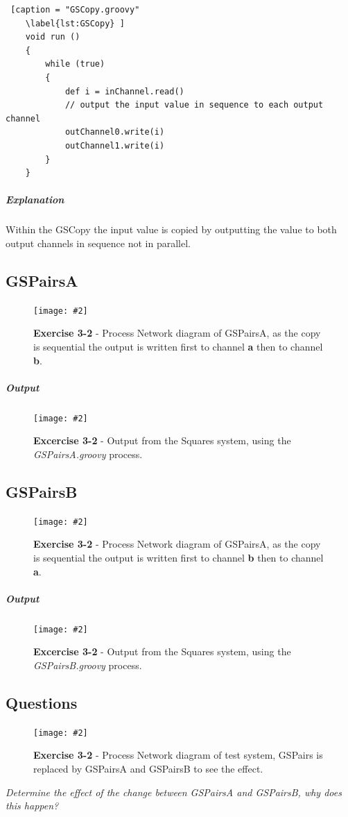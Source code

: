 \documentclass[10pt, a4paper]{article}
\newcommand{\figuremacro}[5]{
    \begin{figure}[#1]
        \centering
        \texttt{[image: \#2]}
        \caption[#3]{\textbf{#3}#4}
        \label{fig:#2}
    \end{figure}
}
\begin{document}
	\begin{lstlisting} [caption = "GSCopy.groovy"
	\label{lst:GSCopy} ]
	void run ()
	{
		while (true)
		{
			def i = inChannel.read()
			// output the input value in sequence to each output channel
			outChannel0.write(i)
			outChannel1.write(i)
		}
	} \end{lstlisting}
	
	\subparagraph{Explanation}
	
	Within the GSCopy the input value is copied by outputting the value to both output channels in sequence not in parallel.
	
	\subsection*{GSPairsA}

	\figuremacro{H}{GPairsAPN}{Exercise 3-2}{ - Process Network diagram of GSPairsA, as the copy is sequential the output is written first to channel \textbf{a} then to channel \textbf{b}.}{1.0}

	\subparagraph{Output} \hfill
	
	\figuremacro{H}{pairsAoutput}{Excercise 3-2}{ -  Output from the Squares system, using the \textit{GSPairsA.groovy} process.}{0.3}
	
	\subsection*{GSPairsB}
	
	\figuremacro{H}{GPairsBPN}{Exercise 3-2}{ - Process Network diagram of GSPairsA, as the copy is sequential the output is written first to channel \textbf{b} then to channel \textbf{a}.}{1.0}

	\subparagraph{Output} \hfill
		
	\figuremacro{H}{pairsBoutput}{Excercise 3-2}{ -  Output from the Squares system, using the \textit{GSPairsB.groovy} process.}{0.2}
	
	\subsection*{Questions}
	
	\figuremacro{H}{GSquaresPN}{Exercise 3-2}{ - Process Network diagram of test system, GSPairs is replaced by GSPairsA and GSPairsB to see the effect.}{1.0}
	
	\textit{Determine the effect of the change between GSPairsA and GSPairsB, why does this happen?} 
	
\end{document}
